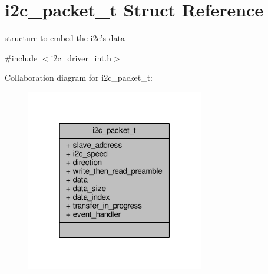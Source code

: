 \hypertarget{structi2c__packet__t}{\section{i2c\+\_\+packet\+\_\+t Struct Reference}
\label{structi2c__packet__t}
}


structure to embed the i2c's data  




{\ttfamily \#include $<$i2c\+\_\+driver\+\_\+int.\+h$>$}



Collaboration diagram for i2c\+\_\+packet\+\_\+t\+:
\nopagebreak
\begin{figure}[H]
\begin{center}
\leavevmode
\includegraphics[width=220pt]{structi2c__packet__t__coll__graph}
\end{center}
\end{figure}
